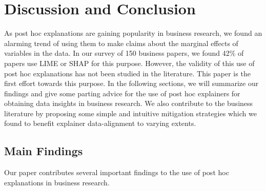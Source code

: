 \documentclass[12pt]{article}  %
\begin{document}
\section{Discussion and Conclusion}
    \label{sec:discussion}
    As post hoc explanations are gaining popularity in business research, we found an alarming trend of using them to make claims about the marginal effects of variables in the data. In our survey of 150 business papers, we found 42\% of papers use LIME or SHAP for this purpose. However, the validity of this use of post hoc explanations has not been studied in the literature. 
    This paper is the first effort towards this purpose. 
     In the following sections, we will summarize our findings and give some parting advice for the use of post hoc explainers for obtaining data insights in business research. 
    We also contribute to the business literature by proposing some simple and intuitive mitigation strategies which we found to benefit explainer data-alignment to varying extents.


    \subsection{Main Findings}
        Our paper contributes several important findings to the use of post hoc explanations in business research.
\end{document}
